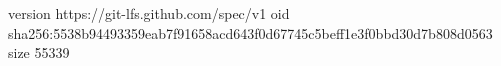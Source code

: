 version https://git-lfs.github.com/spec/v1
oid sha256:5538b94493359eab7f91658acd643f0d67745c5beff1e3f0bbd30d7b808d0563
size 55339
